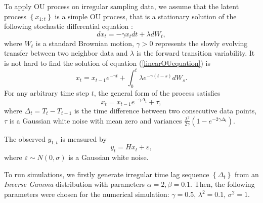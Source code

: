 To apply OU process on irregular sampling data, we assume that the latent process $\left\lbrace x_{1:t}\right\rbrace$ is a simple OU process, that is a stationary solution of the following stochastic differential equation : 
\begin{equation}\label{linearOUequation}
dx_t= -\gamma x_tdt+\lambda dW_t, 
\end{equation}
where $W_t$ is a standard Brownian motion, $\gamma>0$ represents the slowly evolving transfer between two neighbor data and $\lambda$ is the forward transition variability. It is not hard to find the solution of equation (\ref{linearOUequation}) is 
\begin{equation*}
x_t = x_{t-1}e^{-\gamma t} +\int_{0}^{t} \lambda e^{-\gamma (t-s)}dW_s. 
\end{equation*}
For any arbitrary time step $t$, the general form of the process satisfies 
\begin{equation}
x_t = x_{t-1}e^{-\gamma \Delta_t} + \tau,
\end{equation}
where $\Delta_t = T_t-T_{t-1}$ is the time difference between two consecutive data points, $\tau$ is a Gaussian white noise with mean zero and variances $\frac{\lambda^2}{2\gamma}\left(1-e^{-2\gamma\Delta_t}\right)$. 

The observed $y_{1:t}$ is measured by 
\begin{equation}
y_t = Hx_t + \varepsilon,
\end{equation}
where $\varepsilon\sim N(0,\sigma)$ is a Gaussian white noise. 

To run simulations, we firstly generate irregular time lag sequence $\left\lbrace \Delta_t\right\rbrace$ from an \textit{Inverse Gamma} distribution with parameters $\alpha=2, \beta=0.1$. Then, the following parameters were chosen for the numerical simulation: $\gamma = 0.5$, $\lambda^2 = 0.1$, $\sigma^2=1$. 



